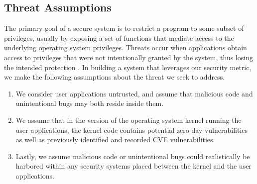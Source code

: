\subsection{Threat Assumptions}

The primary goal of a secure system is to restrict a program to some subset of privileges, 
usually by exposing a set of functions that mediate access to the underlying operating system privileges. 
Threats occur when applications obtain access to privileges that were not intentionally granted by the system, 
thus losing the intended protection \cite{Repy-10}. In building a system that leverages our security metric, 
we make the following assumptions about the threat we seek to address.

\begin{enumerate}
\item We consider user applications untrusted, and assume that malicious code and unintentional bugs may both reside inside them.

\item We assume that in the version of the operating system kernel running the user applications, 
the kernel code contains potential zero-day vulnerabilities as well as previously identified and recorded CVE vulnerabilities.

\item Lastly, we assume malicious code or unintentional bugs could realistically be harbored 
within any security systems placed between the kernel and the user applications.
\end{enumerate}